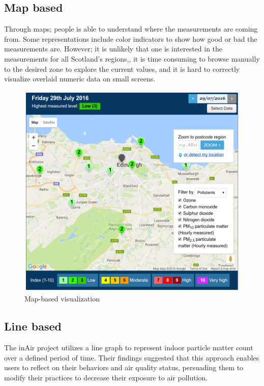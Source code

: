\subsection{Map based}
Through maps; people is able to understand where the measurements are coming from. Some representations include color indicators to show how good or bad the measurements are. However; it is unlikely that one is interested in the measurements for all Scotland's regions,, it is time consuming to browse manually to the desired zone to explore the current values, and it is hard to correctly visualize overlaid numeric data on small screens.

\begin{figure}[H]
\begin{adjustbox}{width=1\textwidth,center=\textwidth}
  \centering
  \includegraphics[scale=.30]{images/map_visualization.png}
\end{adjustbox}
  \caption[Map-based visualization]{Map-based visualization \cite{Scottishairquality.co.uk2016}}
  \label{fig:web_based_desktop_visualization}
\end{figure}


\subsection{Line based}
The inAir project \cite{Kim2013} utilizes a line graph to represent indoor particle matter count over a defined period of time. Their findings suggested that this approach enables users to reflect on their behaviors and air quality status, persuading them to modify their practices to decrease their exposure to air pollution.

